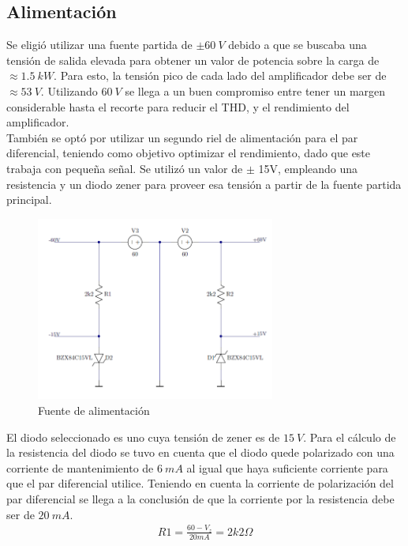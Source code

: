 
\subsection{Alimentación}
Se eligió utilizar una fuente partida de $\pm60 \ V$  debido a que se buscaba una tensión de salida elevada para obtener un valor de potencia sobre la carga de $\approx 1.5 \ kW$. Para esto, la tensión pico de cada lado del amplificador debe ser de $\approx 53 \ V$. Utilizando $60 \ V$ se llega a un buen compromiso entre tener un margen considerable hasta el recorte para reducir el THD, y el rendimiento del amplificador.\\ 
También se optó por utilizar un segundo riel de alimentación para el par diferencial, teniendo como objetivo optimizar el rendimiento, dado que este trabaja con pequeña señal. Se utilizó un valor de $\pm$ 15V, empleando una resistencia y un diodo zener para proveer esa tensión a partir de la fuente partida principal.
\begin{figure}[H]
\centering
	\includegraphics[width=0.7\textwidth]{ImagenesAlimentacion/al.png}
	\caption{Fuente de alimentación}
	\label{fig:alimentacion}
\end{figure}
El diodo seleccionado es uno cuya tensión de zener es de $15 \ V$.
Para el cálculo de la resistencia del diodo se tuvo en cuenta que el diodo quede polarizado con una corriente de mantenimiento de $6 \ mA$ al igual que haya suficiente corriente para que el par diferencial utilice. Teniendo en cuenta la corriente de polarización del par diferencial se llega a la conclusión de que la corriente por la resistencia debe ser de $20 \ mA$.
\begin{align}
R1=\frac{60-V_z}{20mA}= 2k2\Omega
\end{align}
